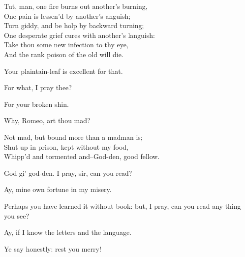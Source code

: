 \begin{speech}
Tut, man, one fire burns out another's burning, \\

One pain is lessen'd by another's anguish; \\
Turn giddy, and be holp by backward turning; \\
One desperate grief cures with another's languish: \\
Take thou some new infection to thy eye, \\
And the rank poison of the old will die. \\
\end{speech}
\begin{speech}
Your plaintain-leaf is excellent for that. \\
\end{speech}
\begin{speech}
For what, I pray thee? \\
\end{speech}
\begin{speech}
For your broken shin. \\
\end{speech}
\begin{speech}
Why, Romeo, art thou mad? \\
\end{speech}
\begin{speech}
Not mad, but bound more than a madman is; \\
Shut up in prison, kept without my food, \\
Whipp'd and tormented and--God-den, good fellow. \\
\end{speech}
\begin{speech}
God gi' god-den.   I pray, sir, can you read?
\end{speech}
\begin{speech}
Ay, mine own fortune in my misery.
\end{speech}
\begin{speech}
Perhaps you have learned it without
book: but, I pray, can you read any thing you
see?
\end{speech}
\begin{speech}
Ay, if I know the letters and the language.
\end{speech}
\begin{speech}
Ye say honestly: rest you merry!
\end{speech}
